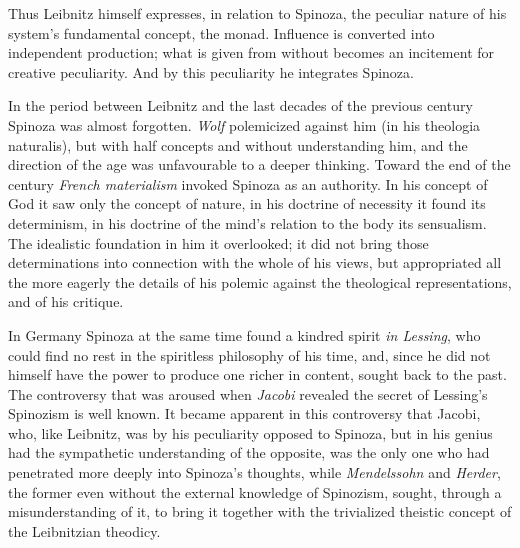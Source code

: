\documentclass[12pt,a4paper,openany]{book}
\newcommand{\opage}[1]{\marginnote{\footnotesize\textit{[#1]}}}
\begin{document}
\opage{186} Thus Leibnitz himself expresses, in relation to Spinoza,
the peculiar nature of his system's fundamental concept, the monad.
Influence is converted into independent production; what is given
from without becomes an incitement for creative peculiarity.
And by this peculiarity he integrates
Spinoza.

In the period between Leibnitz and the last decades
of the previous century Spinoza was almost forgotten. \emph{Wolf}
polemicized against him (in his theologia naturalis), but with
half concepts and without understanding him, and the direction of the age
was unfavourable to a deeper thinking. Toward the end of the century
\emph{French materialism} invoked
Spinoza as an authority. In his concept of God it saw
only the concept of nature, in his doctrine of necessity
it found its determinism, in his doctrine of the mind's relation
to the body its sensualism. The idealistic foundation
in him it overlooked; it did not bring those determinations
into connection with the whole of his views, but appropriated
all the more eagerly the details of his polemic
against the theological representations, and of his critique.

In Germany Spinoza at the same time found a kindred spirit
\emph{in Lessing}, who could find no rest in the spiritless
philosophy of his time, and, since he did not himself have the power to produce
one richer in content, sought back to the past. The
controversy that was aroused when \emph{Jacobi} revealed the secret of
Lessing's Spinozism is well known. It became apparent in this
controversy that Jacobi, who, like Leibnitz, was by his peculiarity
opposed to Spinoza, but in his genius had the
sympathetic understanding of the opposite, was the only one
who had penetrated more deeply into Spinoza's thoughts, while \emph{Mendelssohn}
and \emph{Herder}, the former even without the external
knowledge of Spinozism, sought, through a misunderstanding of
it, to bring it together with the trivialized theistic concept
of the Leibnitzian theodicy.
\end{document}
